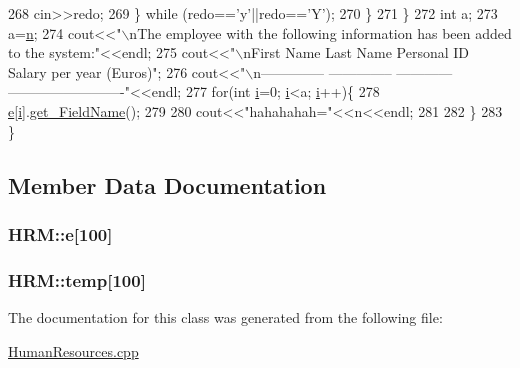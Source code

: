 \begin{DoxyCode}
268         cin>>redo;
269       \} \textcolor{keywordflow}{while} (redo==\textcolor{charliteral}{'y'}||redo==\textcolor{charliteral}{'Y'});
270     \}
271   \}
272   \textcolor{keywordtype}{int} a;
273   a=\hyperlink{HumanResources_8cpp_a76f11d9a0a47b94f72c2d0e77fb32240}{n};
274   cout<<\textcolor{stringliteral}{"\(\backslash\)nThe employee with the following information has been added to the system:"}<<endl;
275   cout<<\textcolor{stringliteral}{"\(\backslash\)nFirst Name       Last Name       Personal ID         Salary per year (Euros)"};
276   cout<<\textcolor{stringliteral}{"\(\backslash\)n--------------   --------------  ------------       -------------------------"}<<endl;
277   \textcolor{keywordflow}{for}(\textcolor{keywordtype}{int} \hyperlink{HumanResources_8cpp_acb559820d9ca11295b4500f179ef6392}{i}=0; \hyperlink{HumanResources_8cpp_acb559820d9ca11295b4500f179ef6392}{i}<a; \hyperlink{HumanResources_8cpp_acb559820d9ca11295b4500f179ef6392}{i}++)\{
278     \hyperlink{classHRM_a79ccbda5f455cec5a04d53968f60e6af}{e}[\hyperlink{HumanResources_8cpp_acb559820d9ca11295b4500f179ef6392}{i}].\hyperlink{classPerson_a0ba48694a16ae01e279dcecca67206a1}{get\_FieldName}();
279  
280     cout<<\textcolor{stringliteral}{"hahahahah="}<<n<<endl;
281  
282   \}
283 \}
\end{DoxyCode}


\subsection{Member Data Documentation}
\subsubsection[{\texorpdfstring{e}{e}}]{ H\+R\+M\+::e\mbox{[}100\mbox{]}\hspace{0.3cm}{\ttfamily [private]}}\hypertarget{classHRM_a79ccbda5f455cec5a04d53968f60e6af}{}\label{classHRM_a79ccbda5f455cec5a04d53968f60e6af}
\subsubsection[{\texorpdfstring{temp}{temp}}]{ H\+R\+M\+::temp\mbox{[}100\mbox{]}\hspace{0.3cm}{\ttfamily [private]}}\hypertarget{classHRM_a6ddac0a68719ee52ed2328d0c4e6fc8f}{}\label{classHRM_a6ddac0a68719ee52ed2328d0c4e6fc8f}


The documentation for this class was generated from the following file\+:\begin{DoxyCompactItemize}
\item 
\hyperlink{HumanResources_8cpp}{Human\+Resources.\+cpp}\end{DoxyCompactItemize}
